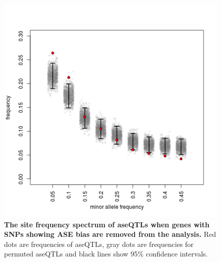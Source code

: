 \begin{figure}[ht]
      \centering
       \includegraphics[width=\linewidth]{Ch3FigS9}
    \caption{\textbf{The site frequency spectrum of aseQTLs when genes with SNPs showing ASE bias are removed from the analysis.} Red dots are frequencies of aseQTLs, gray dots are frequencies for permuted aseQTLs and black lines show 95\% confidence intervals. }
    \label{fig:3figS9}
\end{figure}
